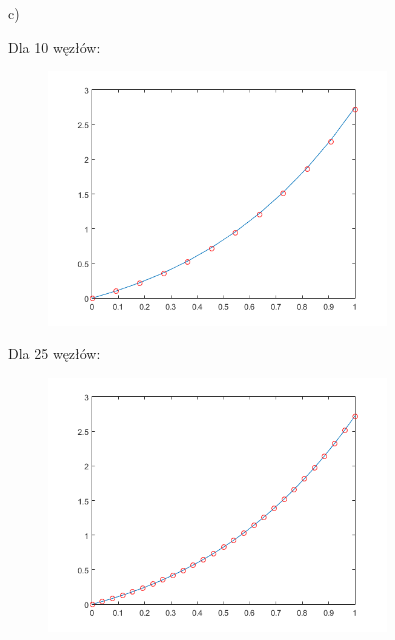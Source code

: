 \newpage

c)\\
\begin{samepage}
	Dla 10 węzłów:
	
	
	
	\FloatBarrier
	\begin{figure}[!ht]
		\begin{center}
			\includegraphics[width=0.8\textwidth]{Lab4/charts/zad4/3/10.png}
		\end{center}
	\end{figure}
	\FloatBarrier
\end{samepage}

\begin{samepage}
	Dla 25 węzłów:
	\begin{figure}[!ht]
		\begin{center}
			\includegraphics[width=0.8\textwidth]{Lab4/charts/zad4/3/25.png}
		\end{center}
	\end{figure}
	\FloatBarrier
\end{samepage}

